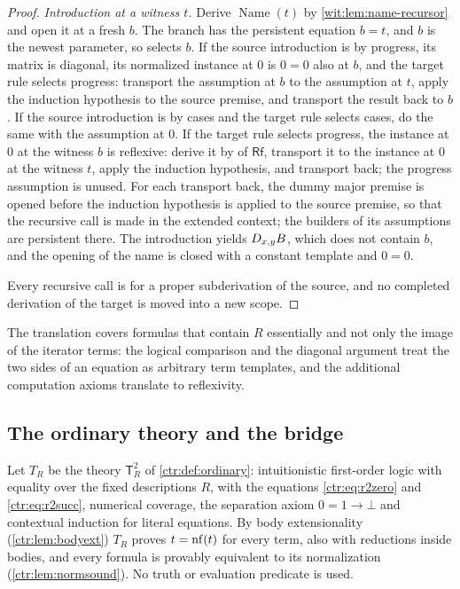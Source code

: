 \begin{proof}
\emph{Introduction at a witness $t$.}  Derive $\operatorname{Name}(t)$ by
\cref{wit:lem:name-recursor} and open it at a fresh $b$.  The branch has the
persistent equation $b=t$, and $b$ is the newest parameter, so
 selects $b$.  If the source introduction is by progress,
its matrix is diagonal, its normalized instance at $0$ is $0=0$ also at $b$,
and the target rule selects progress: transport the assumption at $b$ to the
assumption at $t$, apply the induction hypothesis to the source premise, and
transport the result back to $b$.  If the source introduction is by cases
and the target rule selects cases, do the same with the assumption at $0$.
If the target rule selects progress, the instance at $0$ at the witness $b$
is reflexive: derive it by  of $\mathsf{Rf}$, transport it to
the instance at $0$ at the witness $t$, apply the induction hypothesis, and
transport back; the progress assumption is unused.  For each transport back,
the dummy major premise is opened before the induction hypothesis is applied
to the source premise, so that the recursive call is made in the extended
context; the builders of its assumptions are persistent there.  The
introduction yields $D_{x,y}B$, which does not contain $b$, and the opening
of the name is closed with a constant template and $0=0$.

Every recursive call is for a proper subderivation of the source, and no
completed derivation of the target is moved into a new scope.
\end{proof}

The translation covers formulas that contain $R$ essentially and not only
the image of the iterator terms: the logical comparison and the diagonal
argument treat the two sides of an equation as arbitrary term templates, and
the additional computation axioms translate to reflexivity.

\subsection{The ordinary theory and the bridge}

Let $T_R$ be the theory $\mathsf T_R^2$ of \cref{ctr:def:ordinary}:
intuitionistic first-order logic with equality over the fixed descriptions
$R$, with the equations \eqref{ctr:eq:r2zero} and \eqref{ctr:eq:r2succ},
numerical coverage, the separation axiom $0=1\to\bot$ and contextual
induction for literal equations.  By body extensionality
(\cref{ctr:lem:bodyext}) $T_R$ proves $t=\operatorname{nf}(t)$ for every term, also with
reductions inside bodies, and every formula is provably equivalent to its
normalization (\cref{ctr:lem:normsound}).  No truth or evaluation predicate
is used.


